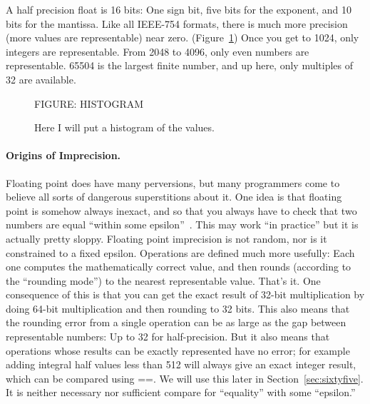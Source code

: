 \documentclass[twocolumn]{article}
\begin{document}
A half precision float is 16 bits: One sign bit, five bits for the
exponent, and 10 bits for the mantissa. Like all IEEE-754 formats,
there is much more precision (more values are representable) near
zero. (Figure~\ref{fig:histogram}) Once you get to 1024,
only integers are representable. From 2048 to 4096, only even numbers
are representable. 65504 is the largest finite number, and up here,
only multiples of 32 are available.

\begin{figure}
FIGURE: HISTOGRAM
\caption{
Here I will put a histogram of the values.
  } \label{fig:histogram}
\end{figure}

\paragraph{Origins of Imprecision.}
Floating point does have many perversions, but many programmers come
to believe all sorts of dangerous superstitions about it. One idea is
that floating point is somehow always inexact, and so that you always
have to check that two numbers are equal ``within some
epsilon''~\cite{murphy2014epsilon}. This may work ``in practice'' but
it is actually pretty sloppy. Floating point imprecision is not
random, nor is it constrained to a fixed epsilon. Operations are
defined much more usefully: Each one computes the mathematically
correct value, and then rounds (according to the ``rounding mode'') to
the nearest representable value. That's it. One consequence of this is
that you can get the exact result of 32-bit multiplication by doing
64-bit multiplication and then rounding to 32 bits. This also means
that the rounding error from a single operation can be as large as the
gap between representable numbers: Up to 32 for half-precision. But it
also means that operations whose results can be exactly represented
have no error; for example adding integral half values less than 512
will always give an exact integer result, which can be compared using
==. We will use this later in Section~\ref{sec:sixtyfive}. It is
neither necessary nor sufficient compare for ``equality'' with some
``epsilon.''
\end{document}
